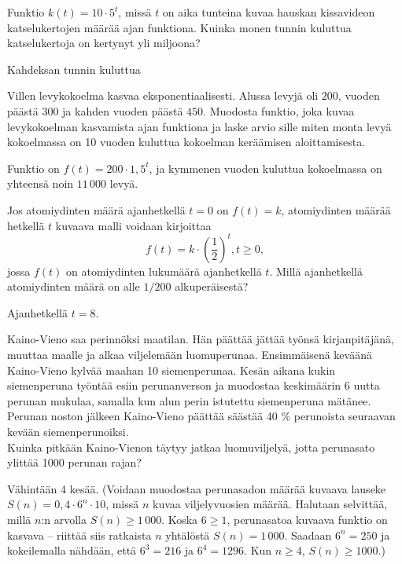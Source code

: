 \begin{tehtavasivu}
\begin{tehtava}
Funktio $k(t) = 10 \cdot 5^t$, missä $t$ on aika tunteina kuvaa hauskan kissavideon katselukertojen määrää ajan funktiona. Kuinka monen tunnin kuluttua katselukertoja on kertynyt yli miljoona?
\begin{vastaus}
Kahdeksan tunnin kuluttua
\end{vastaus}
\end{tehtava}

\begin{tehtava}
Villen levykokoelma kasvaa eksponentiaalisesti. Alussa levyjä oli $200$, vuoden päästä $300$ ja kahden vuoden päästä $450$. Muodosta funktio, joka kuvaa levykokoelman kasvamista ajan funktiona ja laske arvio sille miten monta levyä kokoelmassa on 10 vuoden kuluttua kokoelman keräämisen aloittamisesta.
\begin{vastaus}
Funktio on $f(t) = 200 \cdot 1,5^t$, ja kymmenen vuoden kuluttua kokoelmassa on yhteensä noin $11\,000$ levyä. %
\end{vastaus}
\end{tehtava}

\begin{tehtava}
Jos atomiydinten määrä ajanhetkellä $t=0$ on $f(t)=k$, atomiydinten määrää hetkellä $t$ kuvaava malli voidaan kirjoittaa \[f(t) = k \cdot \left( \frac{1}{2} \right)^t, t \ge 0,\] jossa $f(t)$ on atomiydinten lukumäärä ajanhetkellä $t$. Millä ajanhetkellä atomiydinten määrä on alle $1/200$ alkuperäisestä?
\begin{vastaus}
Ajanhetkellä $t = 8$.
\end{vastaus}
\end{tehtava}

\begin{tehtava}
Kaino-Vieno saa perinnöksi maatilan. Hän päättää jättää työnsä kirjanpitäjänä, muuttaa maalle ja alkaa 
viljelemään luomuperunaa. Ensimmäisenä keväänä Kaino-Vieno kylvää maahan 10 siemenperunaa. Kesän aikana kukin siemenperuna 
työntää esiin perunanverson ja muodostaa keskimäärin 6 uutta perunan mukulaa, samalla kun alun perin istutettu 
siemenperuna mätänee. Perunan noston jälkeen Kaino-Vieno päättää säästää 40 \% perunoista seuraavan kevään siemenperunoiksi.\\
Kuinka pitkään Kaino-Vienon täytyy jatkaa luomuviljelyä, jotta perunasato ylittää 1000 perunan rajan? 
	\begin{vastaus}
	Vähintään 4 kesää. (Voidaan muodostaa perunasadon määrää kuvaava lauseke $S(n)=0,4\cdot6^n\cdot10$, missä $n$ kuvaa 
	viljelyvuosien määrää. Halutaan selvittää, millä $n$:n arvolla $S(n)\geq1\,000$. 
	Koska $6\geq1$, perunasatoa kuvaava funktio on kasvava -- riittää siis ratkaista $n$ yhtälöstä $S(n)=1\,000$.
	Saadaan $6^n=250$ ja kokeilemalla nähdään, että $6^3=216$ ja $6^4=1296$. Kun $n\geq4$, $S(n)\geq1000$.)
	\end{vastaus}


\end{tehtava}
\end{tehtavasivu}
